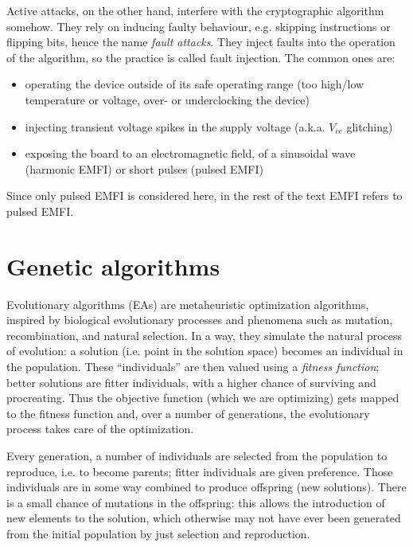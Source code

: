 \documentclass[times, utf8, diplomski]{fer}
\begin{document}
Active attacks, on the other hand, interfere with the cryptographic algorithm
somehow. They rely on inducing faulty behaviour, e.g. skipping instructions or
flipping bits, hence the name \emph{fault attacks}. They inject faults into the
operation of the algorithm, so the practice is called fault injection.
The common ones are:
\begin{itemize}
  \item operating the device outside of its safe operating range
        (too high/low temperature or voltage, over- or underclocking the device)
  \item injecting transient voltage spikes in the supply voltage (a.k.a. $V_{cc}$ glitching)
  \item exposing the board to an electromagnetic field, of a sinusoidal wave (harmonic EMFI)
        or short pulses (pulsed EMFI)
\end{itemize}


Since only pulsed EMFI is considered here, in the rest of the text EMFI refers
to pulsed EMFI.


\section{Genetic algorithms}\label{sec:GAs}
Evolutionary algorithms (EAs) are metaheuristic optimization algorithms,
inspired by biological evolutionary processes and phenomena such as mutation,
recombination, and natural selection.
In a way, they simulate the natural process of evolution: a solution
(i.e. point in the solution space) becomes an individual in the population.
These ``individuals'' are then valued using a \emph{fitness function}; better
solutions are fitter individuals, with a higher chance of surviving and procreating.
Thus the objective function (which we are optimizing) gets mapped to the fitness function
and, over a number of generations, the evolutionary process takes care of the optimization.

Every generation, a number of individuals are selected from the population to
reproduce, i.e. to become parents; fitter individuals are given preference.
Those individuals are in some way combined to produce offspring (new solutions).
There is a small chance of mutations in the offspring: this allows the introduction
of new elements to the solution, which otherwise may not have ever been generated
from the initial population by just selection and reproduction.
\end{document}
